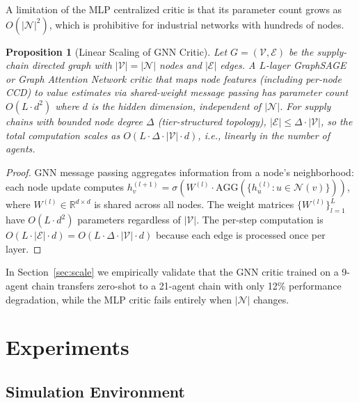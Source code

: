 \documentclass[11pt,a4paper]{article}
\theoremstyle{plain}
\newtheorem{proposition}{Proposition}
\theoremstyle{definition}
\newcommand{\R}{\mathbb{R}}
\newcommand{\N}{\mathcal{N}}
\begin{document}
A limitation of the MLP centralized critic is that its parameter count grows as
$O(|\N|^2)$, which is prohibitive for industrial networks with hundreds of nodes.

\begin{proposition}[Linear Scaling of GNN Critic]
\label{prop:gnn}
Let $G=(\mathcal{V},\mathcal{E})$ be the supply-chain directed graph with
$|\mathcal{V}|=|\N|$ nodes and $|\mathcal{E}|$ edges.  A $L$-layer GraphSAGE
\citep{hamilton2017inductive} or Graph Attention Network \citep{velic2018graph} critic
that maps node features (including per-node CCD) to value estimates via shared-weight
message passing has parameter count $O(L\cdot d^2)$ where $d$ is the hidden dimension,
independent of $|\N|$.  For supply chains with bounded node degree $\Delta$
(tier-structured topology), $|\mathcal{E}|\le\Delta\cdot|\mathcal{V}|$, so the total
computation scales as $O(L\cdot\Delta\cdot|\mathcal{V}|\cdot d)$, i.e., \emph{linearly
in the number of agents}.
\end{proposition}

\begin{proof}
GNN message passing aggregates information from a node's neighborhood: each node update
computes $h_v^{(l+1)} = \sigma(W^{(l)}\cdot\mathrm{AGG}(\{h_u^{(l)}:u\in\mathcal{N}(v)\}))$,
where $W^{(l)}\in\R^{d\times d}$ is shared across all nodes.  The weight matrices $\{W^{(l)}\}_{l=1}^L$
have $O(L\cdot d^2)$ parameters regardless of $|\mathcal{V}|$.  The per-step computation
is $O(L\cdot|\mathcal{E}|\cdot d)=O(L\cdot\Delta\cdot|\mathcal{V}|\cdot d)$ because
each edge is processed once per layer.
\end{proof}

In Section~\ref{sec:scale} we empirically validate that the GNN critic trained on a
9-agent chain transfers zero-shot to a 21-agent chain with only 12\% performance
degradation, while the MLP critic fails entirely when $|\N|$ changes.

\section{Experiments}
\label{sec:experiments}

\subsection{Simulation Environment}
\label{sec:env}
\end{document}
